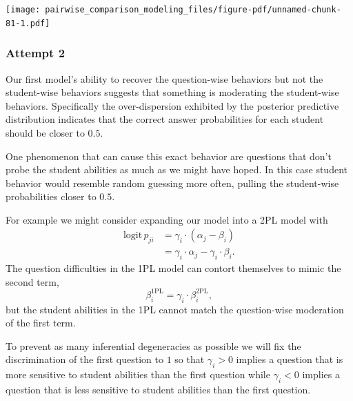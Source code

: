 \documentclass[
  letterpaper,
  DIV=11,
  numbers=noendperiod]{scrartcl}
\begin{document}
\texttt{[image: pairwise\_comparison\_modeling\_files/figure-pdf/unnamed-chunk-81-1.pdf]}

\subsubsection{Attempt 2}\label{attempt-2}

Our first model's ability to recover the question-wise behaviors but not
the student-wise behaviors suggests that something is moderating the
student-wise behaviors. Specifically the over-dispersion exhibited by
the posterior predictive distribution indicates that the correct answer
probabilities for each student should be closer to \(0.5\).

One phenomenon that can cause this exact behavior are questions that
don't probe the student abilities as much as we might have hoped. In
this case student behavior would resemble random guessing more often,
pulling the student-wise probabilities closer to \(0.5\).

For example we might consider expanding our model into a 2PL model with
\begin{align*}
\mathrm{logit} \, p_{ji}
&=
\gamma_{i} \cdot (\alpha_{j} - \beta_{i} )
\\
&=
\gamma_{i} \cdot \alpha_{j} - \gamma_{i} \cdot \beta_{i}.
\end{align*} The question difficulties in the 1PL model can contort
themselves to mimic the second term, \[
\beta_{i}^{\text{1PL}} = \gamma_{i} \cdot \beta_{i}^{\text{2PL}},
\] but the student abilities in the 1PL cannot match the question-wise
moderation of the first term.

To prevent as many inferential degeneracies as possible we will fix the
discrimination of the first question to \(1\) so that \(\gamma_{i} > 0\)
implies a question that is more sensitive to student abilities than the
first question while \(\gamma_{i} < 0\) implies a question that is less
sensitive to student abilities than the first question.
\end{document}
